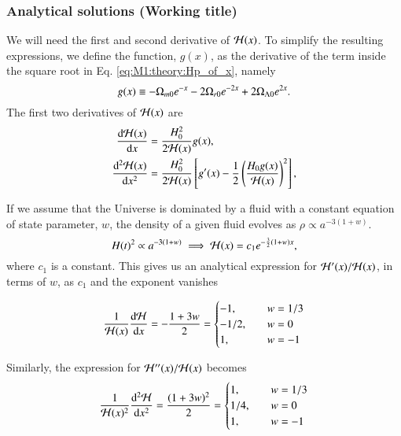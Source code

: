 \subsubsection{Analytical solutions (Working title)}
We will need the first and second derivative of $\mathcal{H}(x)$. To simplify the resulting expressions, we define the function, $g(x)$, as the derivative of the term inside the square root in Eq. \eqref{eq:M1:theory:Hp_of_x}, namely 
\begin{equation}
    g(x) \equiv -\Omega_{m0} e^{-x} -2\Omega_{r0} e^{-2x} + 2\Omega_{\Lambda 0} e^{2x}. \label{eq:M1:theory:g_of_x} 
\end{equation} 
%
The first two derivatives of $\mathcal{H}(x)$ are   
\begin{align} 
    \dv{\mathcal{H}(x)}{x} &= \frac{H_0^2}{2\mathcal{H}(x)}g(x), \label{eq:M1:theory:dHp_dx} \\
    \dv[2]{\mathcal{H}(x)}{x} &= \frac{H_0^2}{2\mathcal{H}(x)}\left[ g'(x) - \frac{1}{2}\left( \frac{H_0 g(x)}{\mathcal{H}(x)} \right)^2 \right], \label{eq:M1:theory:ddHp_ddx}
\end{align}
%


If we assume that the Universe is dominated by a fluid with a constant equation of state parameter, $w$, the density of a given fluid evolves as $\rho\propto a^{-3(1+w)}$. 
\begin{equation}
    H(t)^2 \propto a^{-3(1+w)}\implies \mathcal{H}(x) = c_1 e^{-\frac{3}{2}(1+w)x},
\end{equation}
where $c_1$ is a constant. This gives us an analytical expression for $\mathcal{H}'(x)/\mathcal{H}(x)$, in terms of $w$, as $c_1$ and the exponent vanishes 

\begin{equation}
    \frac{1}{\mathcal{H}(x)}\dv{\mathcal{H}}{x} = - \frac{1+3w}{2} = 
    \begin{cases}
        -1,\quad & w=1/3 \\ 
        -1/2, \quad & w=0 \\ 
        1, \quad & w=-1
    \end{cases} 
\end{equation}  


Similarly, the expression for $\mathcal{H}''(x)/\mathcal{H}(x)$ becomes  
\begin{equation}
    \frac{1}{\mathcal{H}(x)^2}\dv[2]{\mathcal{H}}{x} = \frac{(1+3w)^2}{2} = 
    \begin{cases}
        1,\quad & w=1/3 \\ 
        1/4,\quad & w=0 \\ 
        1,\quad & w=-1 
    \end{cases}
\end{equation}

